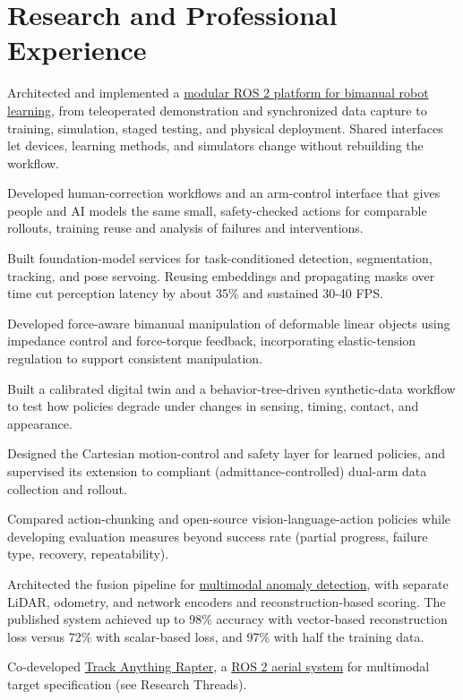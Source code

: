 \documentclass[10pt]{article}
\begin{document}
\section{Research and Professional Experience}
\begin{compactitems}
\item Architected and implemented a \href{https://tvpian.github.io/#current}{modular ROS 2 platform for bimanual robot learning}, from teleoperated demonstration and synchronized data capture to training, simulation, staged testing, and physical deployment. Shared interfaces let devices, learning methods, and simulators change without rebuilding the workflow.
\item Developed human-correction workflows and an arm-control interface that gives people and AI models the same small, safety-checked actions for comparable rollouts, training reuse and analysis of failures and interventions.
\item Built foundation-model services for task-conditioned detection, segmentation, tracking, and pose servoing. Reusing embeddings and propagating masks over time cut perception latency by about 35\% and sustained 30-40 FPS.
\item Developed force-aware bimanual manipulation of deformable linear objects using impedance control and force-torque feedback, incorporating elastic-tension regulation to support consistent manipulation.
\item Built a calibrated digital twin and a behavior-tree-driven synthetic-data workflow to test how policies degrade under changes in sensing, timing, contact, and appearance.
\item Designed the Cartesian motion-control and safety layer for learned policies, and supervised its extension to compliant (admittance-controlled) dual-arm data collection and rollout.
\item Compared action-chunking and open-source vision-language-action policies while developing evaluation measures beyond success rate (partial progress, failure type, recovery, repeatability).
\end{compactitems}
\begin{compactitems}
\item Architected the fusion pipeline for \href{https://doi.org/10.1007/978-3-031-74835-6_15}{multimodal anomaly detection}, with separate LiDAR, odometry, and network encoders and reconstruction-based scoring. The published system achieved up to 98\% accuracy with vector-based reconstruction loss versus 72\% with scalar-based loss, and 97\% with half the training data.
\item Co-developed \href{https://arxiv.org/abs/2405.11655}{Track Anything Rapter}, a \href{https://github.com/tvpian/Project-TAR}{ROS 2 aerial system} for multimodal target specification (see Research Threads).
\end{compactitems}
\end{document}
